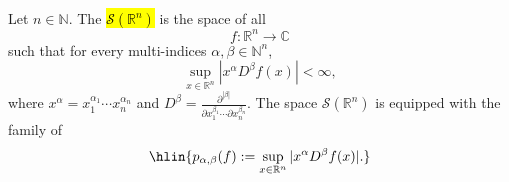 \begin{definition} \label{definition:schwartz_space_on_Rn}
Let $n \in \mathbb{N}$. The  \hl{$\mathcal{S}(\mathbb{R}^n)$} is the space of all 
$$f : \mathbb{R}^n \to \mathbb{C}$$
such that for every multi-indices $\alpha, \beta \in \mathbb{N}^n$,
$$\sup_{x \in \mathbb{R}^n} |x^\alpha D^\beta f(x)| < \infty,$$
where $x^\alpha = x_1^{\alpha_1} \cdots x_n^{\alpha_n}$ and $D^\beta = \frac{\partial^{|\beta|}}{\partial x_1^{\beta_1} \cdots \partial x_n^{\beta_n}}$. The space $\mathcal{S}(\mathbb{R}^n)$ is equipped with the family of 
$$\hlin{p_{\alpha, \beta}(f) := \sup_{x \in \mathbb{R}^n} |x^\alpha D^\beta f(x)|.}$$
\end{definition}
